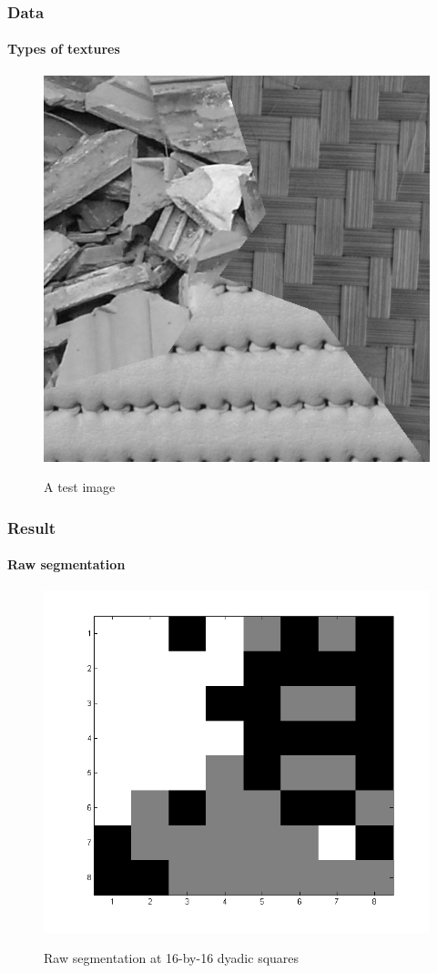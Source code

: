 \documentclass[12pt]{beamer}
\begin{document}
\begin{frame}
  \frametitle{Data}
  \framesubtitle{Types of textures}
  
  \begin{figure}[H]
  \centering
  \includegraphics[scale=0.3]{../data/tm1_1_1}
  \label{fig:tm1_1_1}
  \caption{A test image}
  \end{figure} 
  
\end{frame}

\begin{frame}
  \frametitle{Result}
  \framesubtitle{Raw segmentation}
  
  \begin{figure}[H]
  \centering
  \includegraphics[scale=0.3]{../figs/raw_seg_k=4}
  \label{fig:tm1_1_1}
  \caption{Raw segmentation at 16-by-16 dyadic squares}
  \end{figure} 
  
\end{frame}
\end{document}
